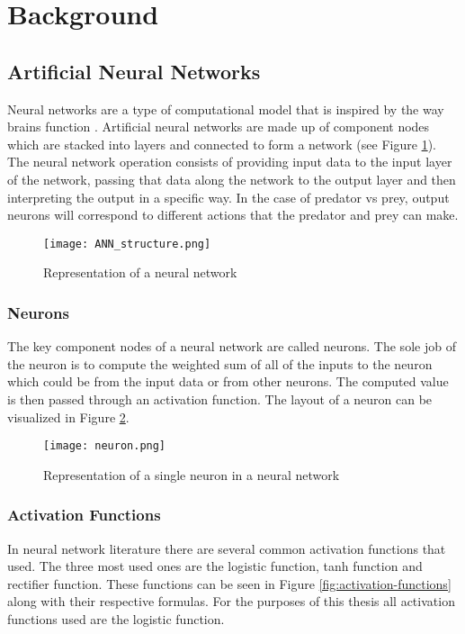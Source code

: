 
\section{Background}

\subsection{Artificial Neural Networks}
Neural networks are a type of computational model that is inspired by the way brains function \cite{Sonali}\cite{deep-learning-book}. Artificial neural networks are made up of component nodes which are stacked into layers and connected to form a network (see Figure \ref{fig:neural-network}). The neural network operation consists of providing input data to the input layer of the network, passing that data along the network to the output layer and then interpreting the output in a specific way. In the case of predator vs prey, output neurons will correspond to different actions that the predator and prey can make.

\begin{figure}
  \centering
  \texttt{[image: ANN\_structure.png]}
  \caption{Representation of a neural network\cite{neural-net}}
  \label{fig:neural-network}
\end{figure}

\subsubsection{Neurons}
The key component nodes of a neural network are called neurons. The sole job of the neuron is to compute the weighted sum of all of the inputs to the neuron which could be from the input data or from other neurons. The computed value is then passed through an activation function. The layout of a neuron can be visualized in Figure \ref{fig:neuron}.


\begin{figure}
  \centering
  \texttt{[image: neuron.png]}
  \caption{Representation of a single neuron in a neural network\cite{neuron}}
  \label{fig:neuron}
\end{figure}

\subsubsection{Activation Functions}
In neural network literature there are several common activation functions that used\cite{deep-learning-book}. The three most used ones are the logistic function, tanh function and rectifier function. These functions can be seen in Figure \ref{fig:activation-functions} along with their respective formulas. For the purposes of this thesis all activation functions used are the logistic function.



